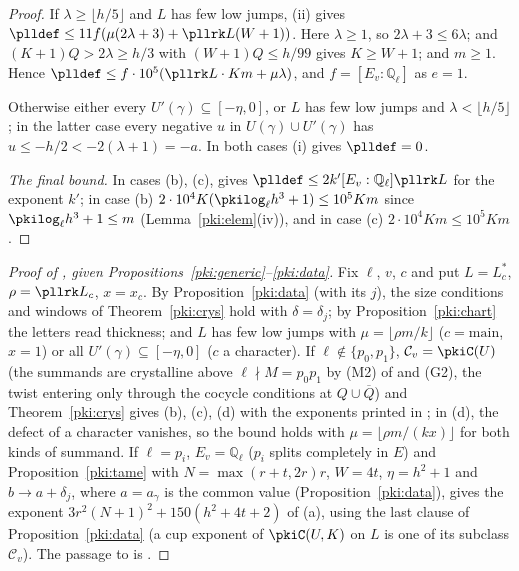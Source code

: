 \documentclass[10pt]{amsart}
\theoremstyle{definition}
\theoremstyle{remark}
\newcommand{\Q}{\mathbb Q}
\providecommand{\aubar}[1]{\overline{#1}}
\begin{document}
\begin{proof}
If $\lambda\ge\lfloor h/5\rfloor$ and $L$ has few low jumps, (ii) gives $\plldef\le
11f(\mu(2\lambda+3)+\pllrk L(W+1))$. Here $\lambda\ge1$, so $2\lambda+3\le6\lambda$; and
$(K+1)Q>2\lambda\ge h/3$ with $(W+1)Q\le h/99$ gives $K\ge W+1$; and $m\ge1$. Hence
$\plldef\le f\cdot10^5(\pllrk L\cdot Km+\mu\lambda)$, and $f=[E_v:\Q_\ell]$ as $e=1$.

Otherwise either every $U'(\gamma)\subseteq[-\eta,0]$, or $L$ has few low jumps and
$\lambda<\lfloor h/5\rfloor$; in the latter case every negative $u$ in $U(\gamma)\cup U'(\gamma)$
has $u\le-h/2<-2(\lambda+1)=-a$. In both cases (i) gives $\plldef=0$.

\emph{The final bound.} In cases (b), (c), {\cite[Lemma~5.6]{P55}} gives $\plldef\le2k'[E_v:\Q_\ell]
\pllrk L$ for the exponent $k'$; in case (b) $2\cdot10^4K(\pkilog_\ell h^3+1)\le10^5Km$ since
$\pkilog_\ell h^3+1\le m$ (Lemma~\ref{pki:elem}(iv)), and in case (c) $2\cdot10^4Km\le10^5Km$.
\end{proof}

\begin{proof}[Proof of {\cite[Theorem~5.8]{P55}}, given Propositions~\ref{pki:generic}--\ref{pki:data}]
Fix $\ell$, $v$, $c$ and put $L=L_c^*$, $\rho=\pllrk L_c$, $x=x_c$. By Proposition~\ref{pki:data}
(with its $j$), the size conditions and windows of Theorem~\ref{pki:crys} hold with
$\delta=\delta_j$; by Proposition~\ref{pki:chart} the letters read thickness; and $L$ has few low
jumps with $\mu=\lfloor\rho m/k\rfloor$ ($c=\mathrm{main}$, $x=1$) or all $U'(\gamma)\subseteq
[-\eta,0]$ ($c$ a character). If $\ell\notin\{p_0,p_1\}$, $\mathcal C_v=\pkiC(U)$ (the summands are crystalline above $\ell\nmid M=p_0p_1$ by (M2) of {\cite[Definition~2.6]{P55}} and (G2), the twist entering only through the cocycle conditions at $Q\cup\aubar Q$) and Theorem~\ref{pki:crys} gives (b), (c), (d) with the exponents printed in
{\cite[Theorem~5.8]{P55}}; in (d), the defect of a character vanishes, so the bound holds with
$\mu=\lfloor\rho m/(kx)\rfloor$ for both kinds of summand. If $\ell=p_i$, $E_v=\Q_\ell$ ($p_i$ splits
completely in $E$) and Proposition~\ref{pki:tame} with $N=\max(r+t,2r)r$, $W=4t$, $\eta=h^2+1$ and
$b\to a+\delta_j$, where $a=a_\gamma$ is the common value (Proposition~\ref{pki:data}), gives the exponent $3r^2(N+1)^2+150(h^2+4t+2)$ of (a), using the last clause
of Proposition~\ref{pki:data} (a cup exponent of $\pkiC(U,K)$ on $L$ is one of its subclass
$\mathcal C_v$). The passage to {\cite[(9)]{P55}} is {\cite[Remark~5.9]{P55}}.
\end{proof}
\end{document}
